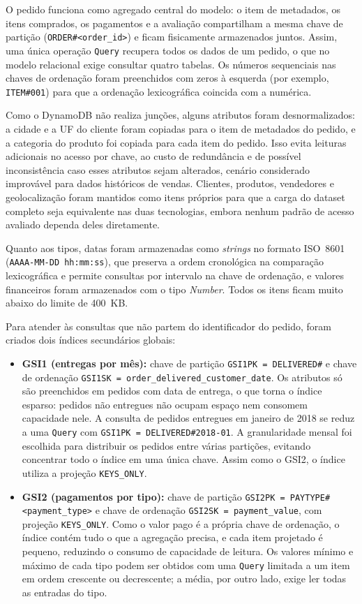 \documentclass[12pt]{article}
\begin{document}
O pedido funciona como agregado central do modelo: o item de metadados, os
itens comprados, os pagamentos e a avaliação compartilham a mesma chave de
partição (\texttt{ORDER\#<order\_id>}) e ficam fisicamente armazenados
juntos. Assim, uma única operação \texttt{Query} recupera todos os dados de
um pedido, o que no modelo relacional exige consultar quatro tabelas. Os
números sequenciais nas chaves de ordenação foram preenchidos com zeros à
esquerda (por exemplo, \texttt{ITEM\#001}) para que a ordenação
lexicográfica coincida com a numérica.
 
Como o DynamoDB não realiza junções, alguns atributos foram
desnormalizados: a cidade e a UF do cliente foram copiadas para o item de
metadados do pedido, e a categoria do produto foi copiada para cada item do
pedido. Isso evita leituras adicionais no acesso por chave, ao custo de
redundância e de possível inconsistência caso esses atributos sejam
alterados, cenário considerado improvável para dados históricos de vendas.
Clientes, produtos, vendedores e geolocalização foram mantidos como itens
próprios para que a carga do dataset completo seja equivalente nas duas
tecnologias, embora nenhum padrão de acesso avaliado dependa deles
diretamente.
 
Quanto aos tipos, datas foram armazenadas como \textit{strings} no formato
ISO~8601 (\texttt{AAAA-MM-DD hh:mm:ss}), que preserva a ordem cronológica na
comparação lexicográfica e permite consultas por intervalo na chave de
ordenação, e valores financeiros foram armazenados com o tipo
\textit{Number}. Todos os itens ficam muito abaixo do limite de 400~KB. 

Para atender às consultas que não partem do identificador do pedido, foram
criados dois índices secundários globais:
 
\begin{itemize}
\item \textbf{GSI1 (entregas por mês):} chave de partição
\texttt{GSI1PK = DELIVERED\#<AAAA-MM>} e chave de ordenação
\texttt{GSI1SK = order\_delivered\_customer\_date}. Os atributos só são
preenchidos em pedidos com data de entrega, o que torna o índice esparso: pedidos não entregues não ocupam espaço nem consomem
capacidade nele. A consulta de pedidos entregues em janeiro de 2018 se
reduz a uma \texttt{Query} com \texttt{GSI1PK = DELIVERED\#2018-01}.
A granularidade mensal foi escolhida para distribuir os pedidos entre
várias partições, evitando concentrar todo o índice em uma única chave.
Assim como o GSI2, o índice utiliza a projeção \texttt{KEYS\_ONLY}.
 
\item \textbf{GSI2 (pagamentos por tipo):} chave de partição
\texttt{GSI2PK = PAYTYPE\#<payment\_type>} e chave de ordenação
\texttt{GSI2SK = payment\_value}, com projeção \texttt{KEYS\_ONLY}. Como o
valor pago é a própria chave de ordenação, o índice contém tudo o que a
agregação precisa, e cada item projetado é pequeno, reduzindo o consumo de
capacidade de leitura. Os valores mínimo e máximo de cada tipo podem ser
obtidos com uma \texttt{Query} limitada a um item em ordem crescente ou
decrescente; a média, por outro lado, exige ler todas as entradas do tipo.
\end{itemize}
 
\end{document}
